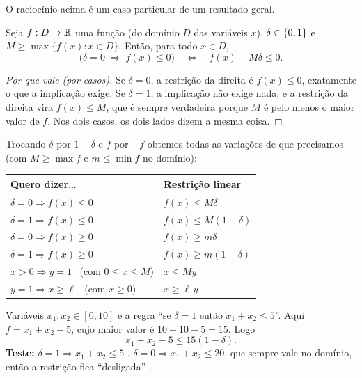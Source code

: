 O raciocínio acima é um caso particular de um resultado geral.

\begin{teorema}
\label{teo:binarias}
Seja $f:D\to\mathbb{R}$ uma função (do domínio $D$ das variáveis $x$), $\delta\in\{0,1\}$ e $M\ge\max\{f(x):x\in D\}$. Então,
para todo $x\in D$,
\[
\big(\delta = 0 \;\Rightarrow\; f(x)\le 0\big) \quad\Longleftrightarrow\quad f(x) - M\delta \le 0 .
\]
\end{teorema}
\begin{proof}[Por que vale (por casos)]
Se $\delta=0$, a restrição da direita é $f(x)\le0$, exatamente o que a implicação exige. Se $\delta=1$, a implicação
não exige nada, e a restrição da direita vira $f(x)\le M$, que é sempre verdadeira porque $M$ é pelo menos o maior
valor de $f$. Nos dois casos, os dois lados dizem a mesma coisa.
\end{proof}

Trocando $\delta$ por $1-\delta$ e $f$ por $-f$ obtemos todas as variações de que precisamos (com $M\ge\max f$ e
$m\le\min f$ no domínio):

\begin{center}
\begin{tabular}{ll}
\toprule
Quero dizer\ldots & Restrição linear\\
\midrule
$\delta=0 \Rightarrow f(x)\le 0$ & $f(x)\le M\delta$\\
$\delta=1 \Rightarrow f(x)\le 0$ & $f(x)\le M(1-\delta)$\\
$\delta=0 \Rightarrow f(x)\ge 0$ & $f(x)\ge m\delta$\\
$\delta=1 \Rightarrow f(x)\ge 0$ & $f(x)\ge m(1-\delta)$\\
\midrule
$x>0 \Rightarrow y=1$ \ (com $0\le x\le M$) & $x\le My$\\
$y=1 \Rightarrow x\ge \ell$ \ (com $x\ge0$) & $x\ge \ell\,y$\\
\bottomrule
\end{tabular}
\end{center}

\begin{exemplo}
Variáveis $x_1,x_2\in[0,10]$ e a regra ``se $\delta=1$ então $x_1+x_2\le 5$''. Aqui $f=x_1+x_2-5$, cujo maior
valor é $10+10-5=15$. Logo
\[
x_1+x_2-5 \le 15(1-\delta).
\]
\textbf{Teste:} $\delta=1\Rightarrow x_1+x_2\le 5$ \checkmark. \quad $\delta=0\Rightarrow x_1+x_2\le 20$, que
sempre vale no domínio, então a restrição fica ``desligada'' \checkmark.
\end{exemplo}

